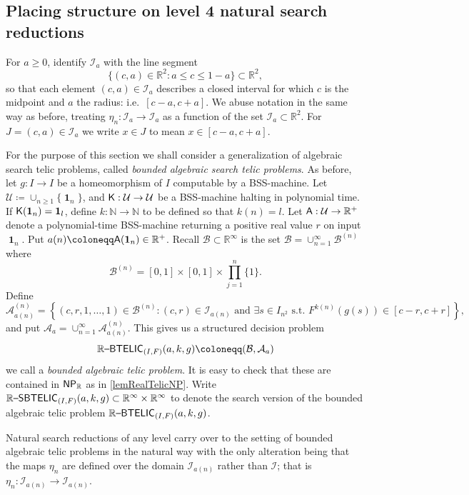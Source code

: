 \documentclass{amsart}
\theoremstyle{theorem}
\theoremstyle{remark}
\DeclareMathOperator{\One}{\textbf{1}}
\newcommand{\NN}{\mathbb{N}}
\newcommand{\RR}{\mathbb{R}}
\newcommand{\ccNP}{\textsf{\upshape NP}}
\newcommand{\ccA}{\textsf{\upshape A}}
\newcommand{\ccK}{\textsf{\upshape K}}
\newcommand{\ccRBTELIC}{\mathbb{R}\textsf{\upshape --BTELIC}}
\newcommand{\ccRSBTELIC}{\mathbb{R}\textsf{\upshape --SBTELIC}}
\newcommand{\cA}{\mathcal{A}}
\newcommand{\cB}{\mathcal{B}}
\newcommand{\cI}{\mathcal{I}}
\newcommand{\cU}{\mathcal{U}}
\begin{document}
\subsection{Placing structure on level 4 natural search reductions}\label{secLevel4}

For $a \geq 0$, identify $\cI_a$ with the line segment
\[
\{(c, a) \in \RR^2 : a \leq c \leq 1-a\} \subset \RR^2,
\]
so that each element $(c, a) \in \cI_a$ describes a closed interval for which $c$ is the midpoint and $a$ the radius: i.e.\ $[c-a, c+a]$.
We abuse notation in the same way as before, treating $\eta_n:\cI_a\rightarrow \cI_a$ as a function of the set $\cI_a \subset \RR^2$. For $J=(c,a) \in \cI_a$ we write $x \in J$ to mean $x \in [c-a,c+a]$.

For the purpose of this section we shall consider a generalization of algebraic search telic problems, called \emph{bounded algebraic search telic problems}.
As before, let $g:I \rightarrow I$ be a homeomorphism of $I$ computable by a BSS-machine.
Let $\cU \coloneqq \cup_{n\geq 1}\{\One_n\}$, and $\ccK:\cU\rightarrow \cU$ be a BSS-machine halting in polynomial time. If $\ccK(\One_n)= \One_l$, define $k:\NN\rightarrow \NN$ to be defined so that $k(n) = l$.
Let $\ccA:\cU\rightarrow \RR^+$ denote a polynomial-time BSS-machine returning a positive real value $r$ on input $\One_n$. Put $a(n)\coloneqq \ccA(\textbf{1}_n) \in \RR^+$.
Recall $\cB\subset \RR^\infty$ is the set $\cB = \cup_{n=1}^\infty \cB^{(n)}$ where 
\[
\cB^{(n)} = [0,1]\times [0,1] \times \prod_{j=1}^n \{1\}.
\]
Define
\[
\cA^{(n)}_{a(n)} = \left\{(c, r, 1,\dots,1) \in \cB^{(n)} : (c, r) \in \cI_{a(n)} \text{ and } \exists s \in I_{n^2} \text{ s.t. } F^{k(n)}(g(s)) \in [c-r, c+r]\right\},
\]
and put $\cA_{a} = \cup_{n=1}^\infty \cA^{(n)}_{a(n)}$.
This gives us a structured decision problem
\[
\ccRBTELIC_{(I, F)}(a,k,g)\coloneqq (\cB, \cA_a)
\]
we call a \emph{bounded algebraic telic problem}. It is easy to check that these are contained in $\ccNP_\RR$ as in \cref{lemRealTelicNP}.
Write $\ccRSBTELIC_{(I, F)}(a,k,g)\subset \RR^\infty \times \RR^\infty$ to denote the search version of the bounded algebraic telic problem $\ccRBTELIC_{(I, F)}(a,k,g)$.

Natural search reductions of any level carry over to the setting of bounded algebraic telic problems in the natural way with the only alteration being that the maps $\eta_n$ are defined over the domain $\cI_{a(n)}$ rather than $\cI$; that is $\eta_n:\cI_{a(n)}\rightarrow \cI_{a(n)}$.
\end{document}
